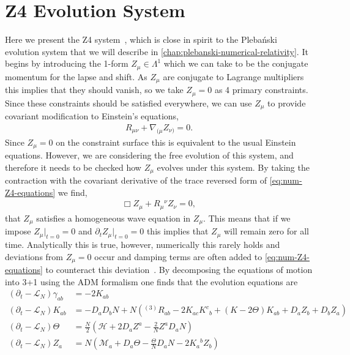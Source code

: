 \documentclass[10pt]{report}
\newcommand{\pleb}[0]{Pleba\'nski}
\theoremstyle{definition}
\begin{document}
\section{Z4 Evolution System} \label{sec:numerical-Z4-system}
Here we present the Z4 system~\cite{General_covaria_Bona_2003}, which is close in spirit to the \pleb{} evolution system that we will describe in \cref{chap:plebanski-numerical-relativity}. It begins by introducing the 1-form $Z_\mu \in \Lambda^1$ which we can take to be the conjugate momentum for the lapse and shift. As $Z_\mu$ are conjugate to Lagrange multipliers this implies that they should vanish, so we take $Z_\mu = 0$ as 4 primary constraints. Since these constraints should be satisfied everywhere, we can use $Z_\mu$ to provide covariant modification to Einstein's equations,
\begin{align}
    R_{\mu\nu} + \nabla_{(\mu} Z_{\nu)} = 0. \label{eq:num-Z4-equations}
\end{align}
Since $Z_\mu = 0$ on the constraint surface this is equivalent to the usual Einstein equations. However, we are considering the free evolution of this system, and therefore it needs to be checked how $Z_\mu$ evolves under this system. By taking the contraction with the covariant derivative of the trace reversed form of \cref{eq:num-Z4-equations} we find,
\begin{align}
    \Box Z_\mu + R_{\mu}{}^\nu Z_\nu = 0,
\end{align}
that $Z_\mu$ satisfies a homogeneous wave equation in $Z_\mu$. This means that if we impose $Z_\mu |_{t=0}=0$ and $\partial_t Z_{\mu}|_{t=0} = 0$ this implies that $Z_\mu$ will remain zero for all time. Analytically this is true, however, numerically this rarely holds and deviations from $Z_\mu = 0$ occur and damping terms are often added to \cref{eq:num-Z4-equations} to counteract this deviation~\cite{Constraint_damp_Gundla_2005}. By decomposing the equations of motion into 3+1 using the ADM formalism one finds that the evolution equations are 
\begin{align}
    \left( \partial_t - \mathcal{L}_{N} \right) \gamma_{ab} &= -2 K_{ab} \\
    \left( \partial_t - \mathcal{L}_{N} \right) K_{ab} &= - D_a D_b N + N \left( {}^{(3)} R_{ab} - 2 K_{ac} K^c{}_b + (K - 2 \Theta) K_{ab} + D_a Z_b + D_b Z_a \right) \\
    \left( \partial_t - \mathcal{L}_{N} \right) \Theta &= \frac{N}{2} \left( \mathcal{H} + 2 D_a Z^a - \frac{2}{N} Z^a D_a N  \right) \\
    \left( \partial_t - \mathcal{L}_{N} \right) Z_a &= N \left( \mathcal{M}_a + D_a \Theta - \frac{\Theta}{N} D_a N - 2 K_a{}^b Z_b \right)
\end{align}
\end{document}
